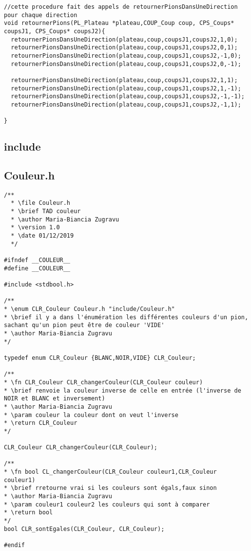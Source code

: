 \begin{lstlisting}
//cette procedure fait des appels de retournerPionsDansUneDirection pour chaque direction
void retournerPions(PL_Plateau *plateau,COUP_Coup coup, CPS_Coups* coupsJ1, CPS_Coups* coupsJ2){
  retournerPionsDansUneDirection(plateau,coup,coupsJ1,coupsJ2,1,0);
  retournerPionsDansUneDirection(plateau,coup,coupsJ1,coupsJ2,0,1);
  retournerPionsDansUneDirection(plateau,coup,coupsJ1,coupsJ2,-1,0);
  retournerPionsDansUneDirection(plateau,coup,coupsJ1,coupsJ2,0,-1);

  retournerPionsDansUneDirection(plateau,coup,coupsJ1,coupsJ2,1,1);
  retournerPionsDansUneDirection(plateau,coup,coupsJ1,coupsJ2,1,-1);
  retournerPionsDansUneDirection(plateau,coup,coupsJ1,coupsJ2,-1,-1);
  retournerPionsDansUneDirection(plateau,coup,coupsJ1,coupsJ2,-1,1);

}
\end{lstlisting}

\subsection{include}
\subsection{Couleur.h}
\begin{lstlisting}
/**
  * \file Couleur.h
  * \brief TAD couleur
  * \author Maria-Biancia Zugravu
  * \version 1.0
  * \date 01/12/2019
  */

#ifndef __COULEUR__
#define __COULEUR__

#include <stdbool.h>

/**
* \enum CLR_Couleur Couleur.h "include/Couleur.h"
* \brief il y a dans l'énumération les différentes couleurs d'un pion, sachant qu'un pion peut être de couleur 'VIDE'
* \author Maria-Biancia Zugravu
*/

typedef enum CLR_Couleur {BLANC,NOIR,VIDE} CLR_Couleur;

/**
* \fn CLR_Couleur CLR_changerCouleur(CLR_Couleur couleur)
* \brief renvoie la couleur inverse de celle en entrée (l'inverse de NOIR et BLANC et inversement)
* \author Maria-Biancia Zugravu
* \param couleur la couleur dont on veut l'inverse
* \return CLR_Couleur
*/

CLR_Couleur CLR_changerCouleur(CLR_Couleur);

/**
* \fn bool CL_changerCouleur(CLR_Couleur couleur1,CLR_Couleur couleur1)
* \brief rretourne vrai si les couleurs sont égals,faux sinon
* \author Maria-Biancia Zugravu
* \param couleur1 couleur2 les couleurs qui sont à comparer
* \return bool
*/
bool CLR_sontEgales(CLR_Couleur, CLR_Couleur);

#endif
\end{lstlisting}

